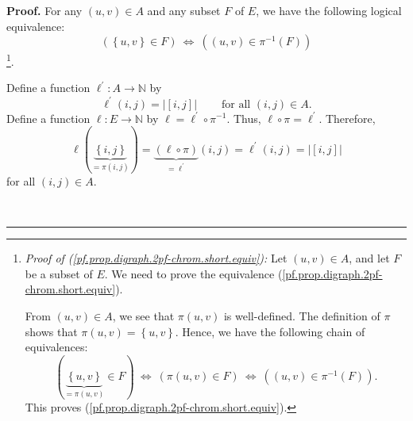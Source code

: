 \documentclass[numbers=enddot,12pt,final,onecolumn,notitlepage]{scrartcl}%
\theoremstyle{definition}
\newenvironment{proof}[1][Proof]{\noindent\textbf{#1.} }{\ \rule{0.5em}{0.5em}}
\newenvironment{vershort}{}{}
\begin{document}
\begin{vershort}
\begin{proof}
For any $\left(  u,v\right)  \in A$ and any subset $F$ of $E$, we have the
following logical equivalence:%
\begin{equation}
\left(  \left\{  u,v\right\}  \in F\right)  \ \Longleftrightarrow\ \left(
\left(  u,v\right)  \in\pi^{-1}\left(  F\right)  \right)
\label{pf.prop.digraph.2pf-chrom.short.equiv}%
\end{equation}
\footnote{\textit{Proof of (\ref{pf.prop.digraph.2pf-chrom.short.equiv}):} Let
$\left(  u,v\right)  \in A$, and let $F$ be a subset of $E$. We need to prove
the equivalence (\ref{pf.prop.digraph.2pf-chrom.short.equiv}).
\par
From $\left(  u,v\right)  \in A$, we see that $\pi\left(  u,v\right)  $ is
well-defined. The definition of $\pi$ shows that $\pi\left(  u,v\right)
=\left\{  u,v\right\}  $. Hence, we have the following chain of equivalences:%
\[
\left(  \underbrace{\left\{  u,v\right\}  }_{=\pi\left(  u,v\right)  }\in
F\right)  \ \Longleftrightarrow\ \left(  \pi\left(  u,v\right)  \in F\right)
\ \Longleftrightarrow\ \left(  \left(  u,v\right)  \in\pi^{-1}\left(
F\right)  \right)  .
\]
This proves (\ref{pf.prop.digraph.2pf-chrom.short.equiv}).}.

Define a function $\ell^{\prime}:A\rightarrow\mathbb{N}$ by%
\[
\ell^{\prime}\left(  i,j\right)  =\left\vert \left[  i,j\right]  \right\vert
\ \ \ \ \ \ \ \ \ \ \text{for all }\left(  i,j\right)  \in A.
\]
Define a function $\ell:E\rightarrow\mathbb{N}$ by $\ell=\ell^{\prime}\circ
\pi^{-1}$. Thus, $\ell\circ\pi=\ell^{\prime}$. Therefore,%
\begin{equation}
\ell\left(  \underbrace{\left\{  i,j\right\}  }_{=\pi\left(  i,j\right)
}\right)  =\underbrace{\left(  \ell\circ\pi\right)  }_{=\ell^{\prime}}\left(
i,j\right)  =\ell^{\prime}\left(  i,j\right)  =\left\vert \left[  i,j\right]
\right\vert \label{pf.prop.digraph.2pf-chrom.short.l}%
\end{equation}
for all $\left(  i,j\right)  \in A$.


\end{proof}
\end{vershort}
\end{document}
